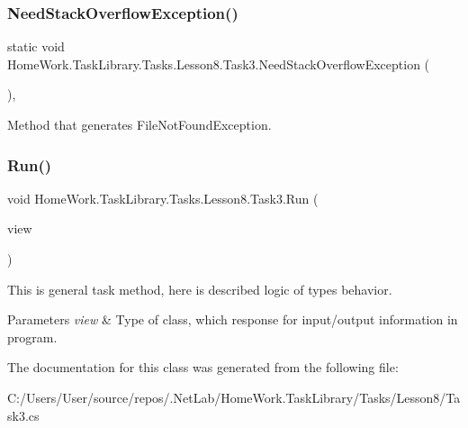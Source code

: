 \subsubsection{\texorpdfstring{NeedStackOverflowException()}{NeedStackOverflowException()}}
{\footnotesize\ttfamily static void Home\+Work.\+Task\+Library.\+Tasks.\+Lesson8.\+Task3.\+Need\+Stack\+Overflow\+Exception (\begin{DoxyParamCaption}{ }\end{DoxyParamCaption})\hspace{0.3cm}{\ttfamily [static]}, {\ttfamily [private]}}



Method that generates File\+Not\+Found\+Exception. 

\mbox{\label{class_home_work_1_1_task_library_1_1_tasks_1_1_lesson8_1_1_task3_a4b4f4b4465f48fc243e76224ce77948d}} 
\subsubsection{\texorpdfstring{Run()}{Run()}}
{\footnotesize\ttfamily void Home\+Work.\+Task\+Library.\+Tasks.\+Lesson8.\+Task3.\+Run (\begin{DoxyParamCaption}\item[{I\+Information}]{view }\end{DoxyParamCaption})}



This is general task method, here is described logic of types behavior. 


\begin{DoxyParams}{Parameters}
{\em view} & Type of class, which response for input/output information in program.\\
\hline
\end{DoxyParams}


The documentation for this class was generated from the following file\+:\begin{DoxyCompactItemize}
\item 
C\+:/\+Users/\+User/source/repos/.\+Net\+Lab/\+Home\+Work.\+Task\+Library/\+Tasks/\+Lesson8/Task3.\+cs\end{DoxyCompactItemize}
